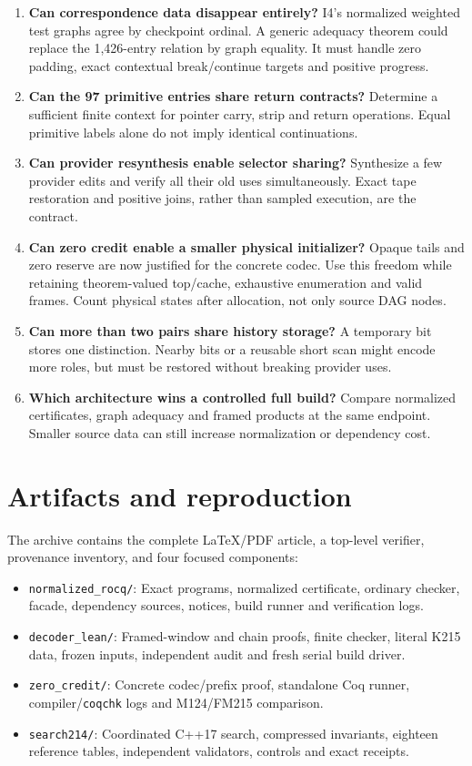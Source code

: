 \documentclass[11pt]{article}
\newcommand{\code}[1]{\texttt{\small #1}}
\begin{document}
\begin{enumerate}
\item \textbf{Can correspondence data disappear entirely?} I4's normalized
weighted test graphs agree by checkpoint ordinal. A generic adequacy theorem
could replace the 1,426-entry relation by graph equality. It must handle zero
padding, exact contextual break/continue targets and positive progress.
\item \textbf{Can the 97 primitive entries share return contracts?} Determine a
sufficient finite context for pointer carry, strip and return operations. Equal
primitive labels alone do not imply identical continuations.
\item \textbf{Can provider resynthesis enable selector sharing?} Synthesize a
few provider edits and verify all their old uses simultaneously. Exact tape
restoration and positive joins, rather than sampled execution, are the contract.
\item \textbf{Can zero credit enable a smaller physical initializer?} Opaque tails
and zero reserve are now justified for the concrete codec. Use this freedom
while retaining theorem-valued top/cache, exhaustive enumeration and valid
frames. Count physical states after allocation, not only source DAG nodes.
\item \textbf{Can more than two pairs share history storage?} A temporary bit
stores one distinction. Nearby bits or a reusable short scan might encode more
roles, but must be restored without breaking provider uses.
\item \textbf{Which architecture wins a controlled full build?} Compare normalized
certificates, graph adequacy and framed products at the same endpoint. Smaller
source data can still increase normalization or dependency cost.
\end{enumerate}

\section{Artifacts and reproduction}

The archive contains the complete LaTeX/PDF article, a top-level verifier,
provenance inventory, and four focused components:
\begin{itemize}
\item \code{normalized\_rocq/}: Exact programs, normalized certificate, ordinary
checker, facade, dependency sources, notices, build runner and verification logs.
\item \code{decoder\_lean/}: Framed-window and chain proofs, finite checker,
literal K215 data, frozen inputs, independent audit and fresh serial build driver.
\item \code{zero\_credit/}: Concrete codec/prefix proof, standalone Coq runner,
compiler/\code{coqchk} logs and M124/FM215 comparison.
\item \code{search214/}: Coordinated C++17 search, compressed invariants, eighteen
reference tables, independent validators, controls and exact receipts.
\end{itemize}
\end{document}
